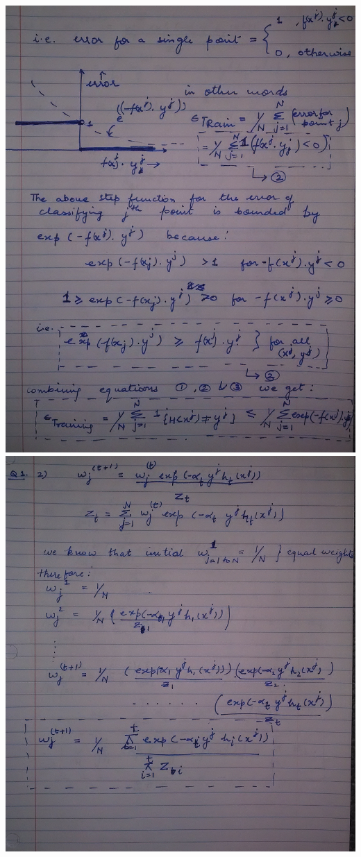 \documentclass[letterpaper]{article}
\begin{document}
\includegraphics[width = 6in]{2.png}
\includegraphics[width = 6in]{3.png}
\end{document}
